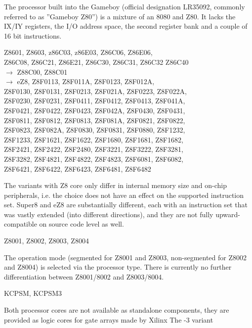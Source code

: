 \documentclass[12pt,twoside]{report}
\begin{document}
The processor built into the Gameboy (official designation LR35092,
commonly referred to as ''Gameboy Z80'') is a mixture of an 8080
and Z80.  It lacks the IX/IY registers, the I/O address space,
the second register bank and a couple of 16 bit instructions.
\begin{cpulist}
   Z8601, Z8603, z86C03, z86E03, Z86C06, Z86E06, \\
\> Z86C08, Z86C21, Z86E21, Z86C30, Z86C31, Z86C32 Z86C40 \\
\> $\rightarrow$ Z88C00, Z88C01 \\
\> $\rightarrow$ eZ8, Z8F0113, Z8F011A, Z8F0123, Z8F012A, \\
\> Z8F0130, Z8F0131, Z8F0213, Z8F021A, Z8F0223, Z8F022A, \\
\> Z8F0230, Z8F0231, Z8F0411, Z8F0412, Z8F0413, Z8F041A, \\
\> Z8F0421, Z8F0422, Z8F0423, Z8F042A, Z8F0430, Z8F0431, \\
\> Z8F0811, Z8F0812, Z8F0813, Z8F081A, Z8F0821, Z8F0822, \\
\> Z8F0823, Z8F082A, Z8F0830, Z8F0831, Z8F0880, Z8F1232, \\
\> Z8F1233, Z8F1621, Z8F1622, Z8F1680, Z8F1681, Z8F1682, \\
\> Z8F2421, Z8F2422, Z8F2480, Z8F3221, Z8F3222, Z8F3281, \\
\> Z8F3282, Z8F4821, Z8F4822, Z8F4823, Z8F6081, Z8F6082, \\
\> Z8F6421, Z8F6422, Z8F6423, Z8F6481, Z8F6482
\end{cpulist}
The variants with Z8 core only differ in internal memory size and
on-chip peripherals, i.e. the choice does not have an effect on the
supported instruction set.  Super8 and eZ8 are substantially different,
each with an instruction set that was vastly extended (into different
directions), and they are not fully upward-compatible on source code
level as well.
\begin{cpulist}
   Z8001, Z8002, Z8003, Z8004
\end{cpulist}
The operation mode (segmented for Z8001 and Z8003, non-segmented for
Z8002 and Z8004) is selected via the processor type.  There is currently
no further differentiation between Z8001/8002 and Z8003/8004.
\begin{cpulist}
   KCPSM, KCPSM3
\end{cpulist}
Both processor cores are not available as standalone components, they are
provided as logic cores for gate arrays made by Xilinx The -3 variant
\end{document}
